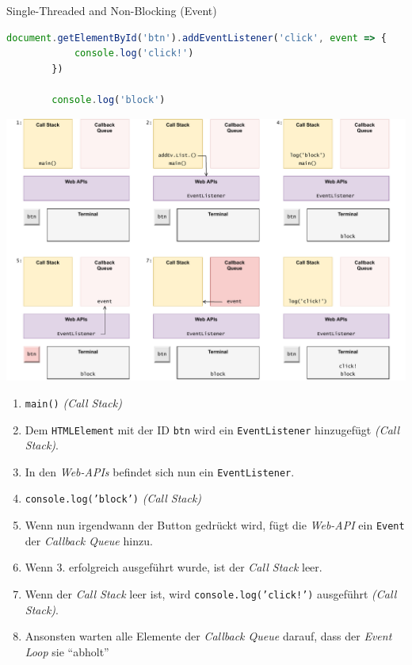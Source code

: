 \begin{example}{Single-Threaded and Non-Blocking (Event)}
    \begin{lstlisting}[language=JavaScript]
        document.getElementById('btn').addEventListener('click', event => {
            console.log('click!')
        })

        console.log('block')
    \end{lstlisting}

    \includegraphics[width=\textwidth]{includes/figures/example_stanb_3.pdf}

    \begin{enumerate}
        \item \texttt{main()} \emph{(Call Stack)}
        \item Dem \texttt{HTMLElement} mit der ID \texttt{btn} wird ein \texttt{EventListener} hinzugefügt \emph{(Call Stack)}.
        \item In den \emph{Web-APIs} befindet sich nun ein \texttt{EventListener}.
        \item \texttt{console.log('block')} \emph{(Call Stack)}
        \item Wenn nun irgendwann der Button gedrückt wird, fügt die \emph{Web-API} ein \texttt{Event} der \emph{Callback Queue} hinzu.
        \item Wenn 3. erfolgreich ausgeführt wurde, ist der \emph{Call Stack} leer.
        \item Wenn der \emph{Call Stack} leer ist, wird \texttt{console.log('click!')} ausgeführt \emph{(Call Stack)}.
        \item Ansonsten warten alle Elemente der \emph{Callback Queue} darauf, dass der \emph{Event Loop} sie \enquote{abholt}
    \end{enumerate}
\end{example}

